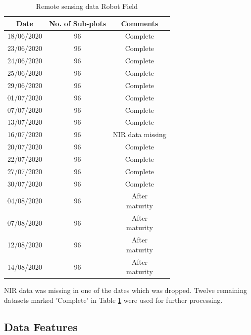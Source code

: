 \documentclass[sigconf, nonacm, natbib, screen, balance=False]{acmart}
\begin{document}
\begin{table}[h!]
  \caption{Remote sensing data Robot Field}
  \label{tab:samples}
  \begin{tabular}{|c|c|c|}
    \hline

    \textbf{Date} & \textbf{No. of Sub-plots} & \textbf{Comments} \\
    \hline

    18/06/2020 & 96 & Complete\\    \hline
    23/06/2020 & 96 & Complete \\ \hline
    24/06/2020 & 96 & Complete \\    \hline
    25/06/2020 & 96 & Complete \\    \hline
    29/06/2020 & 96 & Complete \\    \hline
    01/07/2020 & 96 & Complete \\    \hline
    07/07/2020 & 96 & Complete \\    \hline
    13/07/2020 & 96 & Complete \\    \hline
    16/07/2020 & 96 & NIR data missing \\    \hline
    20/07/2020 & 96 & Complete \\    \hline
    22/07/2020 & 96 & Complete \\    \hline
    27/07/2020 & 96 & Complete \\    \hline
    30/07/2020 & 96 & Complete \\    \hline
    04/08/2020 & 96 & \makecell{After\\maturity}\\    \hline
    07/08/2020 & 96 & \makecell{After\\maturity}\\    \hline
    12/08/2020 & 96 & \makecell{After\\maturity}\\    \hline
    14/08/2020 & 96 & \makecell{After\\maturity}\\

    \hline

  \end{tabular}
\end{table}

NIR data was missing in one of the dates which was dropped. Twelve remaining datasets marked 'Complete' in Table \ref{tab:samples} were used for further processing.

\subsection{Data Features}\label{sec:processing}
\end{document}
